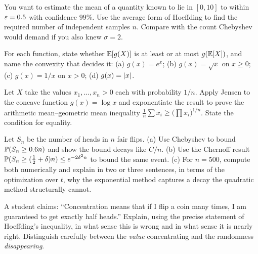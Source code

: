 \begin{exercise}
\label{ch19:ex-hoeff-n}
You want to estimate the mean of a quantity known to lie in $[0,10]$ to within
$\eps = 0.5$ with confidence $99\%$. Use the average form of Hoeffding to find
the required number of independent samples $n$. Compare with the count
Chebyshev would demand if you also knew $\sigma = 2$.
\end{exercise}

\begin{exercise}
\label{ch19:ex-jensen-dir}
For each function, state whether $\E[g(X)]$ is at least or at most $g(\E[X])$,
and name the convexity that decides it: (a) $g(x) = e^x$; (b)
$g(x) = \sqrt{x}$ on $x \ge 0$; (c) $g(x) = 1/x$ on $x > 0$; (d)
$g(x) = \abs{x}$.
\end{exercise}

\begin{exercise}
\label{ch19:ex-amgm}
Let $X$ take the values $x_1,\dots,x_n > 0$ each with probability $1/n$. Apply
Jensen to the concave function $g(x) = \log x$ and exponentiate the result to
prove the arithmetic mean--geometric mean inequality
$\frac1n\sum x_i \ge \bigl(\prod x_i\bigr)^{1/n}$. State the condition for
equality.
\end{exercise}

\begin{exercise}
\label{ch19:ex-proof}
Let $S_n$ be the number of heads in $n$ fair flips. (a) Use Chebyshev to bound
$\P(S_n \ge 0.6n)$ and show the bound decays like $C/n$. (b) Use the Chernoff
result $\P(S_n \ge (\tfrac12+\delta)n) \le e^{-2\delta^2 n}$ to bound the same
event. (c) For $n = 500$, compute both numerically and explain in two or three
sentences, in terms of the optimization over $t$, why the exponential method
captures a decay the quadratic method structurally cannot.
\end{exercise}

\begin{exercise}
\label{ch19:ex-concept}
A student claims: ``Concentration means that if I flip a coin many times, I am
guaranteed to get exactly half heads.'' Explain, using the precise statement of
Hoeffding's inequality, in what sense this is wrong and in what sense it is
nearly right. Distinguish carefully between the \emph{value} concentrating and
the randomness \emph{disappearing}.
\end{exercise}


